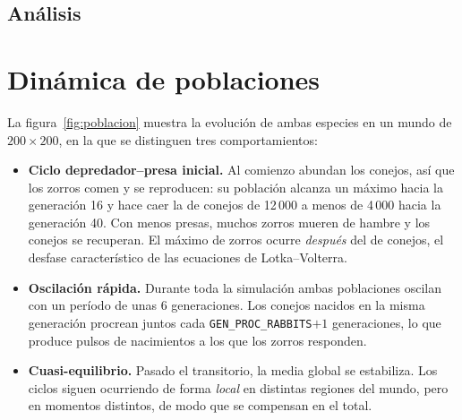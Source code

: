 \documentclass[11pt,a4paper]{article}
\begin{document}
\subsection{Análisis}


\section{Dinámica de poblaciones}
La figura~\ref{fig:poblacion} muestra la evolución de ambas especies en un mundo de $200\times200$, en
la que se distinguen tres comportamientos:
\begin{itemize}[nosep]
  \item \textbf{Ciclo depredador--presa inicial.} Al comienzo abundan los conejos, así que los zorros
    comen y se reproducen: su población alcanza un máximo hacia la generación 16 y hace caer la de
    conejos de 12\,000 a menos de 4\,000 hacia la generación 40. Con menos presas, muchos zorros mueren de hambre y los conejos se
    recuperan. El máximo de zorros ocurre \emph{después} del de conejos, el desfase característico de las
    ecuaciones de Lotka--Volterra.
  \item \textbf{Oscilación rápida.} Durante toda la simulación ambas poblaciones oscilan con un período
    de unas 6 generaciones. Los conejos nacidos en la misma generación procrean juntos cada
    \texttt{GEN\_PROC\_RABBITS}$+1$ generaciones, lo que produce pulsos de nacimientos a los que los zorros
    responden.
  \item \textbf{Cuasi-equilibrio.} Pasado el transitorio, la media global se estabiliza. Los ciclos siguen
    ocurriendo de forma \emph{local} en distintas regiones del mundo, pero en momentos distintos, de modo
    que se compensan en el total.
\end{itemize}
\end{document}
